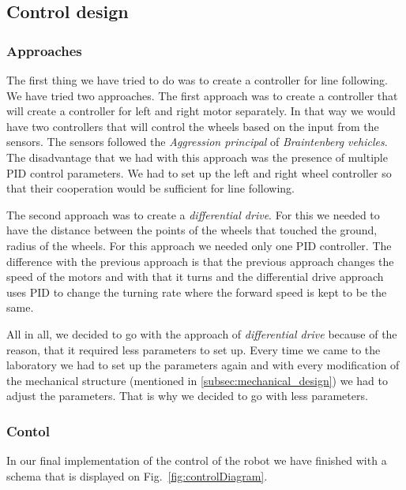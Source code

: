 \documentclass{article}
\begin{document}
\subsection{Control design}
\label{subsec:control_design}

\subsubsection{Approaches}
\label{subsubsec:approaches}

The first thing we have tried to do was to create a controller for line following. We have tried two approaches.
The first approach was to create a controller that will create a controller for left and right motor separately. In
that way we would have two controllers that will control the wheels based on the input from the sensors. The sensors
followed the \textit{Aggression principal} of \textit{Braintenberg vehicles}. The disadvantage that we had with this
approach was the presence of multiple PID control parameters. We had to set up the left and right wheel controller so
that their cooperation would be sufficient for line following.

The second approach was to create a \textit{differential drive}. For this we needed to have the distance between the
points of the wheels that touched the ground, radius of the wheels. For this approach we needed only one PID controller.
The difference with the previous approach is that the previous approach changes the speed of the motors and with that
it turns and the differential drive approach uses PID to change the turning rate where the forward speed is kept to be
the same.

All in all, we decided to go with the approach of \textit{differential drive} because of the reason, that it required
less parameters to set up. Every time we came to the laboratory we had to set up the parameters again and with every
modification of the mechanical structure (mentioned in \ref{subsec:mechanical_design}) we had to adjust the parameters.
That is why we decided to go with less parameters.

\subsubsection{Contol}
\label{subsubsec:control}

In our final implementation of the control of the robot we have finished with a schema that is displayed on
Fig.~\ref{fig:controlDiagram}.
\end{document}
